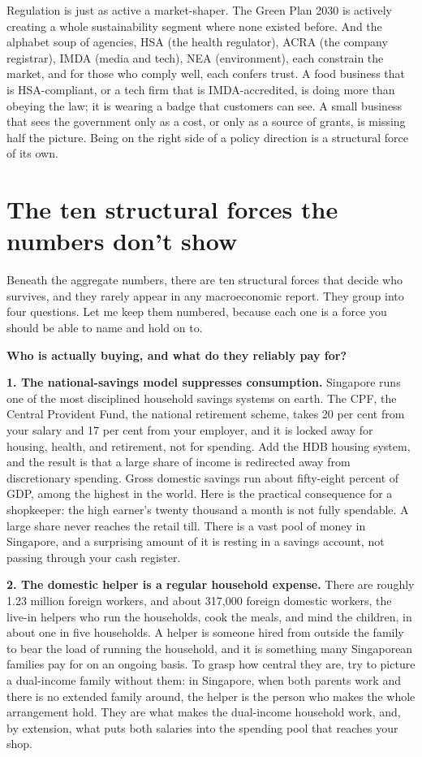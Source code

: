 \documentclass[10pt,twoside,openany]{memoir}
\newcommand{\needspacehead}{\needspace{4\baselineskip}}
\let\oldsection\section
\renewcommand{\section}{\needspacehead\oldsection}
\begin{document}
{{{{{{{{{{{Regulation is just as active a market-shaper. The Green Plan 2030 is
actively creating a whole sustainability segment where none existed
before. And the alphabet soup of agencies, HSA (the health regulator),
ACRA (the company registrar), IMDA (media and tech), NEA (environment),
each constrain the market, and for those who comply well, each confers
trust. A food business that is HSA-compliant, or a tech firm that is
IMDA-accredited, is doing more than obeying the law; it is wearing a
badge that customers can see. A small business that sees the government
only as a cost, or only as a source of grants, is missing half the
picture. Being on the right side of a policy direction is a structural
force of its own.

\section{The ten structural forces the numbers don't
show}\label{the-ten-structural-forces-the-numbers-dont-show}

Beneath the aggregate numbers, there are ten structural forces that
decide who survives, and they rarely appear in any macroeconomic report.
They group into four questions. Let me keep them numbered, because each
one is a force you should be able to name and hold on to.

\textbf{Who is actually buying, and what do they reliably pay for?}

\textbf{1. The national-savings model suppresses consumption.} Singapore
runs one of the most disciplined household savings systems on earth. The
CPF, the Central Provident Fund, the national retirement scheme, takes
20 per cent from your salary and 17 per cent from your employer, and it
is locked away for housing, health, and retirement, not for spending.
Add the HDB housing system, and the result is that a large share of
income is redirected away from discretionary spending. Gross domestic
savings run about fifty-eight percent of GDP, among the highest in the
world. Here is the practical consequence for a shopkeeper: the high
earner's twenty thousand a month is not fully spendable. A large share
never reaches the retail till. There is a vast pool of money in
Singapore, and a surprising amount of it is resting in a savings
account, not passing through your cash register.

\textbf{2. The domestic helper is a regular household expense.} There
are roughly 1.23 million foreign workers, and about 317,000 foreign
domestic workers, the live-in helpers who run the households, cook the
meals, and mind the children, in about one in five households. A helper
is someone hired from outside the family to bear the load of running the
household, and it is something many Singaporean families pay for on an
ongoing basis. To grasp how central they are, try to picture a
dual-income family without them: in Singapore, when both parents work
and there is no extended family around, the helper is the person who
makes the whole arrangement hold. They are what makes the dual-income
household work, and, by extension, what puts both salaries into the
spending pool that reaches your shop.

}}}}}}}}}}}
\end{document}
